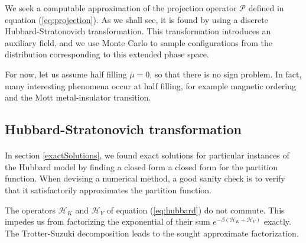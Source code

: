 \documentclass[10pt, twocolumn, twoside]{article}
\begin{document}
We seek a computable approximation of the projection operator $\mathcal{P}$ defined in equation (\ref{eq:projection}). As we shall see, it is found by using a discrete Hubbard-Stratonovich transformation. This transformation introduces an auxiliary field, and we use Monte Carlo to sample configurations from the distribution corresponding to this extended phase space.

For now, let us assume half filling $\mu = 0$, so that there is no sign problem. In fact, many interesting phenomena occur at half filling, for example magnetic ordering and the Mott metal-insulator transition.

\subsection{Hubbard-Stratonovich transformation}\paragraph{}

In section \ref{exactSolutions}, we found exact solutions for particular instances of the Hubbard model by finding a closed form a closed form for the partition function. When devising a numerical method, a good sanity check is to verify that it satisfactorily approximates the partition function.

The operators $\mathcal{H}_K$ and $\mathcal{H}_V$ of equation (\ref{eq:hubbard}) do not commute. This impedes us from factorizing the exponential of their sum $e^{-\beta (\mathcal{H}_K + \mathcal{H}_V)}$ exactly. The Trotter-Suzuki decomposition leads to the sought approximate factorization. 
\end{document}
